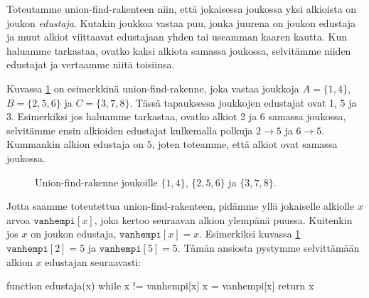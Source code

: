 Toteutamme union-find-rakenteen niin,
että jokaisessa joukossa
yksi alkioista on joukon \emph{edustaja}.
Kutakin joukkoa vastaa puu,
jonka juurena on joukon edustaja ja
muut alkiot viittaavat edustajaan yhden tai useamman kaaren kautta.
Kun haluamme tarkastaa, ovatko kaksi alkiota samassa joukossa,
selvitämme niiden edustajat ja vertaamme niitä toisiinsa.

Kuvassa \ref{fig:unifin} on esimerkkinä union-find-rakenne,
joka vastaa joukkoja $A=\{1,4\}$, $B=\{2,5,6\}$ ja $C=\{3,7,8\}$.
Tässä tapauksessa joukkojen edustajat ovat 1, 5 ja 3.
Esimerkiksi jos haluamme tarkastaa, ovatko alkiot 2 ja 6
samassa joukossa, selvitämme ensin alkioiden edustajat
kulkemalla polkuja $2 \rightarrow 5$ ja $6 \rightarrow 5$.
Kummankin alkion edustaja on $5$, joten toteamme,
että alkiot ovat samassa joukossa.

\begin{figure}
\center
\begin{center}
\end{center}
\caption{Union-find-rakenne joukoille $\{1,4\}$, $\{2,5,6\}$ ja $\{3,7,8\}$.}
\label{fig:unifin}
\end{figure}

Jotta saamme toteutettua union-find-rakenteen,
pidämme yllä jokaiselle alkiolle $x$ arvoa $\texttt{vanhempi}[x]$,
joka kertoo seuraavan alkion ylempänä puussa.
Kuitenkin jos $x$ on joukon edustaja,
$\texttt{vanhempi}[x]=x$.
Esimerkiksi kuvassa \ref{fig:unifin}
$\texttt{vanhempi}[2]=5$ ja $\texttt{vanhempi}[5]=5$.
Tämän ansiosta pystymme selvittämään alkion $x$
edustajan seuraavasti:                                                          

\begin{code}
function edustaja(x)
    while x != vanhempi[x]
        x = vanhempi[x]
    return x
\end{code}

